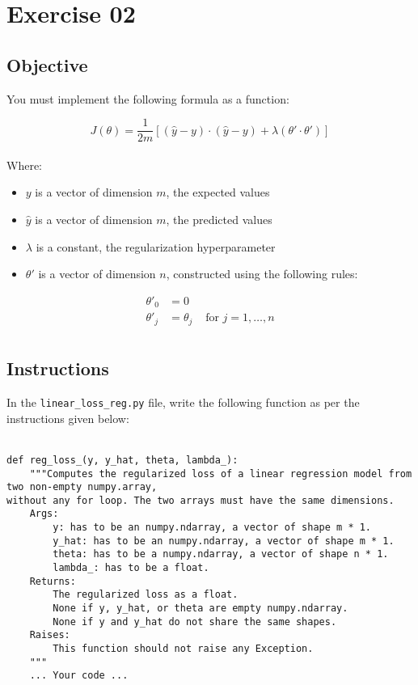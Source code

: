 \chapter{Exercise 02}
\makeheaderfilesforbidden

\section*{Objective}
You must implement the following formula as a function:  

$$
J(\theta)  =  \frac{1}{2m}[(\hat{y} - y)\cdot(\hat{y} - y) + \lambda (\theta' \cdot \theta')]
$$  
\\
Where:
\begin{itemize}
  \item $y$ is a vector of dimension $m$, the expected values
  \item $\hat{y}$ is a vector of dimension $m$, the predicted values
  \item $\lambda$ is a constant, the regularization hyperparameter
  \item $\theta'$ is a vector of dimension $n$, constructed using the following rules:
\end{itemize}
  
$$
\begin{matrix}
\theta'_0 & =  0 \\
\theta'_j & =  \theta_j & \text{ for } j = 1, \dots, n\\
\end{matrix}
$$
\newpage
\section*{Instructions}
In the \texttt{linear\_loss\_reg.py} file, write the following function 
as per the instructions given below:\\
\\
\begin{verbatim}
def reg_loss_(y, y_hat, theta, lambda_):
	"""Computes the regularized loss of a linear regression model from two non-empty numpy.array, 
without any for loop. The two arrays must have the same dimensions.
	Args:
		y: has to be an numpy.ndarray, a vector of shape m * 1.
		y_hat: has to be an numpy.ndarray, a vector of shape m * 1.
		theta: has to be a numpy.ndarray, a vector of shape n * 1.
		lambda_: has to be a float.
	Returns:
		The regularized loss as a float.
		None if y, y_hat, or theta are empty numpy.ndarray.
		None if y and y_hat do not share the same shapes.
	Raises:
		This function should not raise any Exception.
	"""
	... Your code ...
\end{verbatim}

